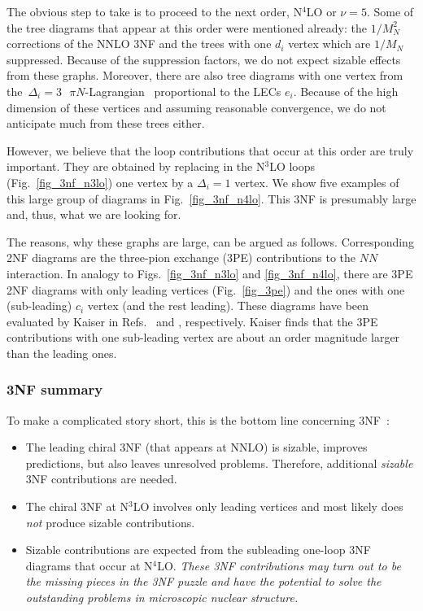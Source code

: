 \documentclass[sort&compress,preprint,3p]{elsarticle}
\begin{document}
The obvious step to take is to proceed to the next order,
N$^4$LO or $\nu=5$. Some of the tree diagrams that appear at this order were mentioned already:
the $1/M_N^2$ corrections of the NNLO 3NF and the trees with one $d_i$
vertex which are $1/M_N$ suppressed. Because of the suppression factors,
we do not expect sizable effects from these graphs.
Moreover, there are also tree diagrams with one vertex from the
$\,\Delta_i=3\,$ $\,\pi N$-Lagrangian~\cite{Fet00,FM00} proportional to the 
LECs $e_i$. Because of the high dimension of these vertices and assuming
reasonable convergence, we do not anticipate much from these trees either.

However, we believe that the loop contributions that occur at this order are truly important.
They are obtained by replacing in the N$^3$LO loops (Fig.~\ref{fig_3nf_n3lo})
one vertex by a $\Delta_i=1$ vertex. 
We show five examples of this large group of diagrams
in Fig.~\ref{fig_3nf_n4lo}.
This 3NF is presumably large and, thus, what we are looking for.

The reasons, why these graphs are large, can be argued as follows.
Corresponding 2NF diagrams are the three-pion exchange (3PE)
contributions to the $NN$ interaction. In analogy to 
Figs.~\ref{fig_3nf_n3lo} and \ref{fig_3nf_n4lo},
there are 3PE 2NF diagrams with only leading vertices (Fig.~\ref{fig_3pe}) 
and the ones with one (sub-leading) 
$c_i$ vertex (and the rest leading). These diagrams have been evaluated by Kaiser in 
Refs.~\cite{Kai00a,Kai00b} and \cite{Kai01}, respectively. 
Kaiser finds that the 3PE contributions with one sub-leading vertex are about
an order magnitude larger than the leading ones.


\subsubsection{3NF summary}

To make a complicated story short, this is the bottom line concerning 3NF~\cite{ME10}:
\begin{itemize}
\item
The leading chiral 3NF (that appears at NNLO) is sizable, improves predictions, but also leaves
unresolved problems. Therefore, additional {\it sizable}
3NF contributions are needed.
\item
The chiral 3NF at N$^3$LO involves only leading vertices and
most likely does {\it not} produce sizable contributions.
\item
Sizable contributions are expected from the subleading one-loop 3NF diagrams
that occur at N$^4$LO. {\it These 3NF contributions may
turn out to be the missing pieces in the 3NF puzzle and have the potential to solve
the outstanding problems in microscopic nuclear structure.}
\end{itemize}
\end{document}
